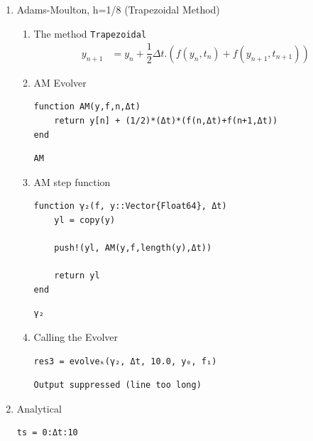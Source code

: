 \documentclass[11pt]{article}
\begin{document}
\begin{enumerate}
\begin{enumerate}
\item Adams-Moulton, h=1/8 (Trapezoidal Method)
\label{sec:org7e3a7c3}
\begin{enumerate}
\item The method
\label{sec:org08dbcc7}
\texttt{Trapezoidal}
\begin{equation}
\begin{aligned}
y_{n+1}&=y_n + \dfrac{1}{2}\Delta{t}.(f(y_n, t_n) + f(y_{n+1}, t_{n+1}))
\end{aligned}
\end{equation}
\item AM Evolver
\label{sec:org8124598}
\begin{verbatim}
function AM(y,f,n,Δt)
    return y[n] + (1/2)*(Δt)*(f(n,Δt)+f(n+1,Δt))
end
\end{verbatim}

\begin{verbatim}
AM
\end{verbatim}

\item AM step function
\label{sec:orgc0c2afb}
\begin{verbatim}
function γ₂(f, y::Vector{Float64}, Δt)
    yl = copy(y)

    push!(yl, AM(y,f,length(y),Δt))

    return yl
end
\end{verbatim}

\begin{verbatim}
γ₂
\end{verbatim}

\item Calling the Evolver
\label{sec:org8e1f817}
\begin{verbatim}
res3 = evolveₖ(γ₂, Δt, 10.0, y₀, f₁)
\end{verbatim}

\begin{verbatim}
Output suppressed (line too long)
\end{verbatim}
\end{enumerate}

\item Analytical
\label{sec:org2e5d6b8}
\begin{verbatim}
ts = 0:Δt:10
\end{verbatim}


\end{enumerate}
\end{enumerate}
\end{document}
